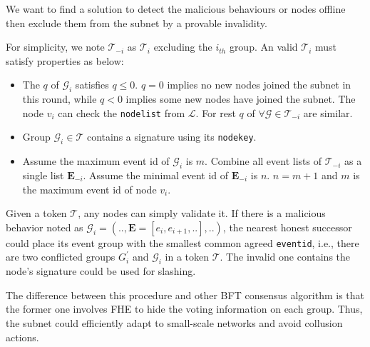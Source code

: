\documentclass[11pt]{article}
\begin{document}
We want to find a solution to detect the malicious behaviours or nodes offline then exclude them from the subnet by a provable invalidity.

For simplicity, we note $\mathcal{T}_{-i}$ as $\mathcal{T}_{i}$ excluding the $i_{th}$ group. An valid $\mathcal{T}_{i}$ must satisfy properties as below:

\begin{itemize}
\item The $q$ of $\mathcal{G}_{i}$ satisfies \(q \leq 0\). $q=0$ implies no new nodes joined the subnet in this round, while $q < 0$ implies some new nodes have joined the subnet. The node $v_{i}$ can check the \texttt{nodelist} from $\mathcal{L}$.
For rest $q$ of $\forall \mathcal{G} \in \mathcal{T}_{-i}$ are similar.
\item Group $\mathcal{G}_{i} \in \mathcal{T}$ contains a signature using its \texttt{nodekey}.
\item Assume the maximum event id of $\mathcal{G}_{i}$ is $m$. Combine all event lists of $\mathcal{T}_{-i}$ as a single list $\mathbf{E}_{-i}$. Assume the minimal event id of $\mathbf{E}_{-i}$ is $n$.
\(n = m+1\) and $m$ is the maximum event id of node $v_{i}$.
\end{itemize}

Given a token $\mathcal{T}$, any nodes can simply validate it.
If there is a malicious behavior noted as \( \mathcal{G}_{i} = (.., \mathbf{E} = [e_{i}, e_{i+1}, ..], ..) \), the nearest honest successor could place its event group with the smallest common agreed \texttt{eventid}, i.e., there are two conflicted groups $G_{i}^{\prime}$ and $\mathcal{G}_{i}$ in a token $\mathcal{T}$.
The invalid one contains the node's signature could be used for slashing.


The difference between this procedure and other BFT consensus algorithm is that the former one involves FHE to hide the voting information on each group.
Thus, the subnet could efficiently adapt to small-scale networks and avoid collusion actions.


\end{document}
